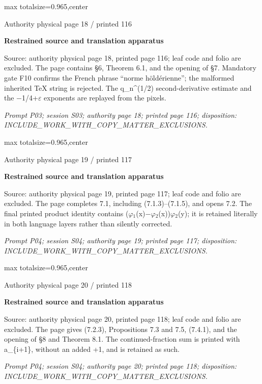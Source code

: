 \documentclass{article}
\begin{document}
\newpage
\noindent\begin{adjustbox}{max totalsize={\textwidth}{0.965\textheight},center}\begin{minipage}{\textwidth}
\noindent\hfill\scriptsize Authority physical page 18 / printed 116\par\normalsize
\textbf{Restrained source and translation apparatus}\par
Source: authority physical page 18, printed page 116; leaf code and folio are excluded. The page contains §6, Theorem 6.1, and the opening of §7. Mandatory gate F10 confirms the French phrase “norme höldérienne”; the malformed inherited TeX string is rejected. The q\_n\textasciicircum{}(1/2) second-derivative estimate and the \ensuremath{-}1/4+\ensuremath{\varepsilon} exponents are replayed from the pixels.
\par\smallskip
\textit{Prompt P03; session S03; authority page 18; printed page 116; disposition: INCLUDE\_WORK\_WITH\_COPY\_MATTER\_EXCLUSIONS.}
\end{minipage}\end{adjustbox}

\newpage
\noindent\begin{adjustbox}{max totalsize={\textwidth}{0.965\textheight},center}\begin{minipage}{\textwidth}
\noindent\hfill\scriptsize Authority physical page 19 / printed 117\par\normalsize
\textbf{Restrained source and translation apparatus}\par
Source: authority physical page 19, printed page 117; leaf code and folio are excluded. The page completes 7.1, including (7.1.3)–(7.1.5), and opens 7.2. The final printed product identity contains (\ensuremath{\varphi}\ensuremath{{}_{1}}(x)\ensuremath{-}\ensuremath{\varphi}\ensuremath{{}_{2}}(x))\ensuremath{\varphi}\ensuremath{{}_{2}}(y); it is retained literally in both language layers rather than silently corrected.
\par\smallskip
\textit{Prompt P04; session S04; authority page 19; printed page 117; disposition: INCLUDE\_WORK\_WITH\_COPY\_MATTER\_EXCLUSIONS.}
\end{minipage}\end{adjustbox}

\newpage
\noindent\begin{adjustbox}{max totalsize={\textwidth}{0.965\textheight},center}\begin{minipage}{\textwidth}
\noindent\hfill\scriptsize Authority physical page 20 / printed 118\par\normalsize
\textbf{Restrained source and translation apparatus}\par
Source: authority physical page 20, printed page 118; leaf code and folio are excluded. The page gives (7.2.3), Propositions 7.3 and 7.5, (7.4.1), and the opening of §8 and Theorem 8.1. The continued-fraction sum is printed with a\_\{i+1\}, without an added +1, and is retained as such.
\par\smallskip
\textit{Prompt P04; session S04; authority page 20; printed page 118; disposition: INCLUDE\_WORK\_WITH\_COPY\_MATTER\_EXCLUSIONS.}
\end{minipage}\end{adjustbox}
\end{document}
